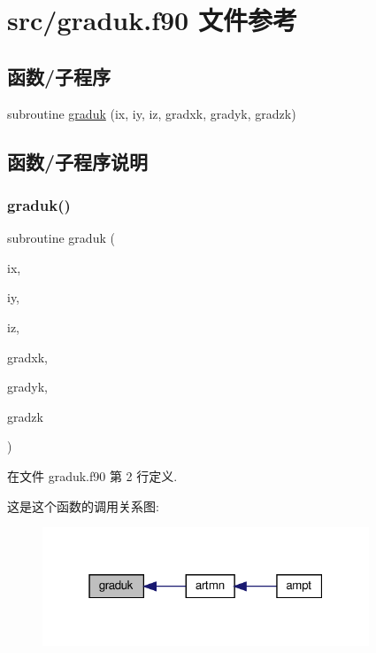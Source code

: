 \hypertarget{graduk_8f90}{}\section{src/graduk.f90 文件参考}
\label{graduk_8f90}
\subsection*{函数/子程序}
\begin{DoxyCompactItemize}
\item 
subroutine \mbox{\hyperlink{graduk_8f90_ac57ef9923c69c340077bb78a85e77ea3}{graduk}} (ix, iy, iz, gradxk, gradyk, gradzk)
\end{DoxyCompactItemize}


\subsection{函数/子程序说明}
\mbox{\label{graduk_8f90_ac57ef9923c69c340077bb78a85e77ea3}} 
\subsubsection{\texorpdfstring{graduk()}{graduk()}}
{\footnotesize\ttfamily subroutine graduk (\begin{DoxyParamCaption}\item[{}]{ix,  }\item[{}]{iy,  }\item[{}]{iz,  }\item[{}]{gradxk,  }\item[{}]{gradyk,  }\item[{}]{gradzk }\end{DoxyParamCaption})}



在文件 graduk.\+f90 第 2 行定义.

这是这个函数的调用关系图\+:
\nopagebreak
\begin{figure}[H]
\begin{center}
\leavevmode
\includegraphics[width=277pt]{graduk_8f90_ac57ef9923c69c340077bb78a85e77ea3_icgraph}
\end{center}
\end{figure}
